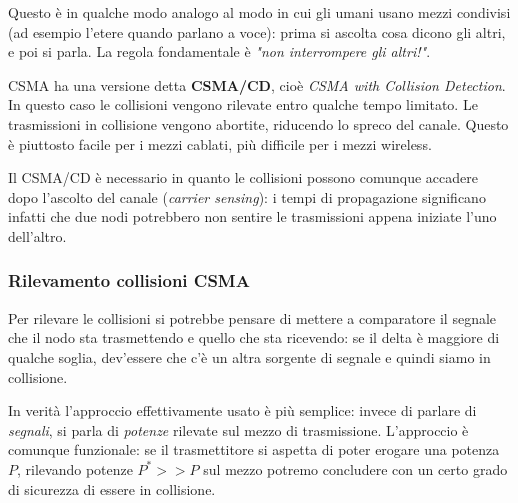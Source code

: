 \documentclass[a4paper,11pt]{article}
\begin{document}
Questo è in qualche modo analogo al modo in cui gli umani usano mezzi condivisi (ad esempio l'etere quando parlano a voce): prima si ascolta cosa dicono gli altri, e poi si parla. La regola fondamentale è \textit{"non interrompere gli altri!"}.

CSMA ha una versione detta \textbf{CSMA/CD}, cioè \textit{CSMA with Collision Detection}.
In questo caso le collisioni vengono rilevate entro qualche tempo limitato.
Le trasmissioni in collisione vengono abortite, riducendo lo spreco del canale.
Questo è piuttosto facile per i mezzi cablati, più difficile per i mezzi wireless. 

Il CSMA/CD è necessario in quanto le collisioni possono comunque accadere dopo l'ascolto del canale (\textit{carrier sensing}): i tempi di propagazione significano infatti che due nodi potrebbero non sentire le trasmissioni appena iniziate l'uno dell'altro.

\subsubsection{Rilevamento collisioni CSMA}
Per rilevare le collisioni si potrebbe pensare di mettere a comparatore il segnale che il nodo sta trasmettendo e quello che sta ricevendo: se il delta è maggiore di qualche soglia, dev'essere che c'è un altra sorgente di segnale e quindi siamo in collisione.

In verità l'approccio effettivamente usato è più semplice: invece di parlare di \textit{segnali}, si parla di \textit{potenze} rilevate sul mezzo di trasmissione. L'approccio è comunque funzionale: se il trasmettitore si aspetta di poter erogare una potenza $P$, rilevando potenze $P^* >> P$ sul mezzo potremo concludere con un certo grado di sicurezza di essere in collisione.
\end{document}
